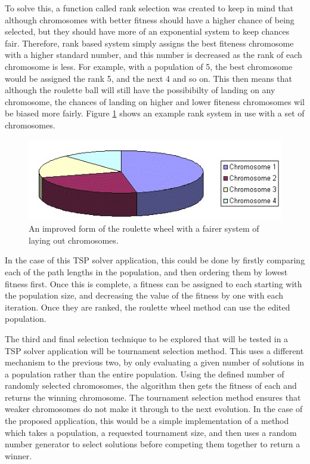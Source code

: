 \documentclass[article]{IEEEtran}
\begin{document}
To solve this, a function called rank selection was created to keep in mind that although chromosomes with better fitness should have a higher chance of being selected, but they should have more of an exponential system to keep chances fair. Therefore, rank based system simply assigns the best fiteness chromosome with a higher standard number, and this number is decreased as the rank of each chromosome is less. For example, with a population of 5, the best chromosome would be assigned the rank 5, and the next 4 and so on. This then means that although the roulette ball will still have the possibibilty of landing on any chromosome, the chances of landing on higher and lower fiteness chromosomes wil be biased more fairly. Figure \ref{fig:4} shows an example rank system in use with a set of chromosomes.
\begin{figure}[H]
\centering
  \includegraphics[width=.8\linewidth]{images/rank}
  \caption{An improved form of the roulette wheel with a fairer system of laying out chromosomes.}
  \label{fig:4}
\end{figure}
In the case of this TSP solver application, this could be done by firstly comparing each of the path lengths in the population, and then ordering them by lowest fitness first. Once this is complete, a fitness can be assigned to each starting with the population size, and decreasing the value of the fitness by one with each iteration. Once they are ranked, the roulette wheel method can use the edited population.\par
The third and final selection technique to be explored that will be tested in a TSP solver application will be tournament selection method. This uses a different mechanism to the previous two, by only evaluating a given number of solutions in a population rather than the entire population. Using the defined number of randomly selected chromosomes, the algorithm then gets the fitness of each and returns the winning chromosome. The tournament selection method ensures that weaker chromosomes do not make it through to the next evolution. In the case of the proposed application, this would be a simple implementation of a method which takes a population, a requested tournament size, and then uses a random number generator to select solutions before competing them together to return a winner. 
\end{document}
